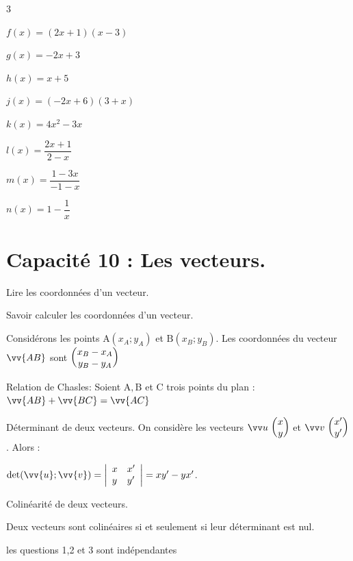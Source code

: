 \documentclass[10pt,a4paper]{article}  %
\begin{document}
\begin{multicols}{3}
	\begin{enumMet}
	\item $f(x)=(2 x+1)(x-3)$
	\item $g(x)=-2 x+3$
	\item $h(x)=x+5$
	\item $j(x)=(-2 x+6)(3+x)$
	\item $k(x)=4 x^{2}-3 x$
	\item $l(x)=\dfrac{2 x+1}{2-x}$
	\item $m(x)=\dfrac{1-3 x}{-1-x}$
	\item $n(x)=1-\dfrac{1}{x}$
\end{enumMet}
\end{multicols}

\section*{Capacité 10 : Les vecteurs.}
\begin{brappel}
	\begin{itemMet}
		\item Lire les coordonnées d'un vecteur.
		\item Savoir calculer les coordonnées d'un vecteur.
		
		Considérons les points $\mathrm{A}\left(x_{A} ; y_{A}\right)$ et $\mathrm{B}\left(x_{B} ; y_{B}\right)$. Les coordonnées du vecteur $\vv{A B}$ sont $\begin{pmatrix} x_{B}-x_{A}\\ y_{B}-y_{A} \end{pmatrix}$
		\item Relation de Chasles: Soient $\mathrm{A}, \mathrm{B}$ et C trois points du plan : $\vv{A B}+\vv{B C}=\vv{A C}$
		\item Déterminant de deux vecteurs. On considère les vecteurs $\Coord{u}{x}{y}$ et $\Coord{v}{x'}{y'}$. Alors :
		
		$\operatorname{det}(\vv{u} ; \vv{v})=\left|\begin{array}{ll}x & x' \\ y & y'\end{array}\right|=x y'-y x'$.
		\item Colinéarité de deux vecteurs.
		
		Deux vecteurs sont colinéaires si et seulement si leur déterminant est nul.
	\end{itemMet}
\end{brappel}

\vspace*{-0.7cm}
\exerciceDS{}
les questions 1,2 et 3 sont indépendantes
\end{document}

